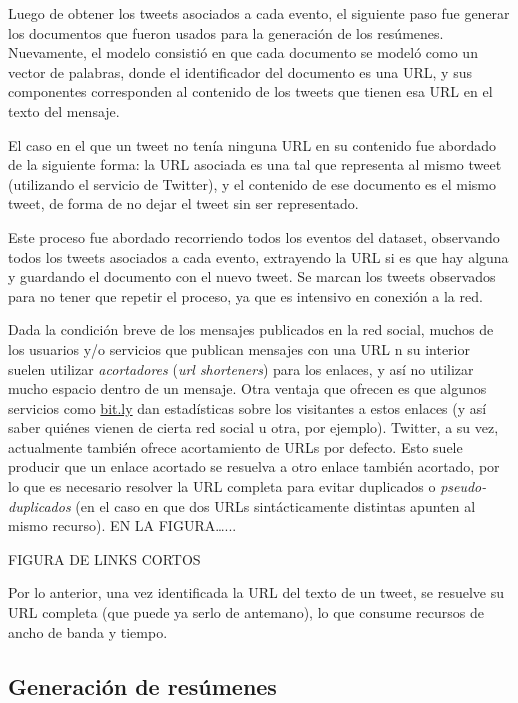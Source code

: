 \documentclass[upright, contnum]{umemoria}
\begin{document}
    Luego de obtener los tweets asociados a cada evento, el siguiente
    paso fue generar los documentos que fueron usados para la
    generación de los resúmenes. Nuevamente, el modelo consistió en que cada
    documento se modeló como un vector de palabras, donde el
    identificador del documento es una URL, y sus componentes
    corresponden al contenido de los tweets que tienen esa URL en el
    texto del mensaje.

    El caso en el que un tweet no tenía ninguna URL en su contenido
    fue abordado de la siguiente forma: la URL asociada es una tal que
    representa al mismo tweet (utilizando el servicio de Twitter), y
    el contenido de ese documento es el mismo tweet, de forma de no
    dejar el tweet sin ser representado.

    Este proceso fue abordado recorriendo todos los eventos del
    dataset, observando todos los tweets asociados a cada evento,
    extrayendo la URL si es que hay alguna y guardando el documento
    con el nuevo tweet. Se marcan los tweets observados para no tener
    que repetir el proceso, ya que es intensivo en conexión a la red.

    Dada la condición breve de los mensajes publicados en la red
    social, muchos de los usuarios y/o servicios que publican mensajes
    con una URL n su interior suelen utilizar \emph{acortadores} (\emph{url shorteners})
    para los enlaces, y así no utilizar mucho espacio dentro de un
    mensaje. Otra ventaja que ofrecen es que algunos servicios como
    \hyperref[sec-1.2.1]{bit.ly} dan estadísticas sobre los visitantes a estos enlaces (y
    así saber quiénes vienen de cierta red social u otra, por
    ejemplo). Twitter, a su vez, actualmente también ofrece
    acortamiento de URLs por defecto. Esto suele producir que un enlace
    acortado se resuelva a otro enlace también acortado, por lo que es
    necesario resolver la URL completa para evitar duplicados o
    \emph{pseudo-duplicados} (en el caso en que dos URLs sintácticamente
    distintas apunten al mismo recurso). EN LA FIGURA\ldots{}...

    FIGURA DE LINKS CORTOS

    Por lo anterior, una vez identificada la URL del texto de un
    tweet, se resuelve su URL completa (que puede ya serlo de
    antemano), lo que consume recursos de ancho de banda y
    tiempo. 


\subsection{Generación de resúmenes}
\label{sec-1.2.2}
\end{document}
